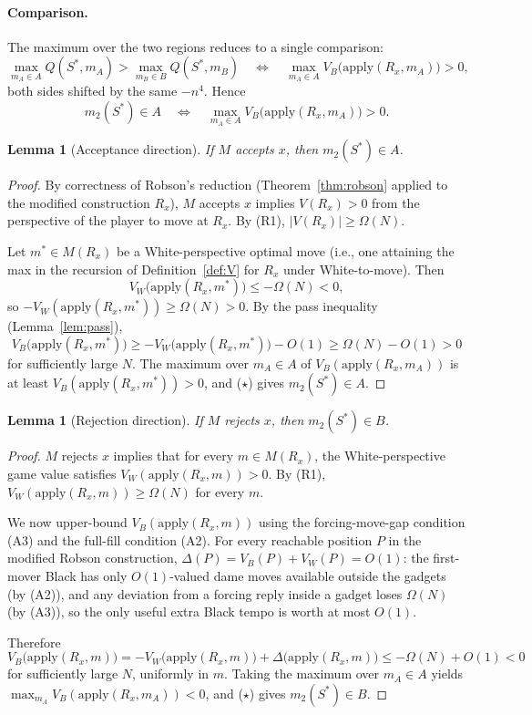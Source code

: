 \documentclass[11pt,a4paper]{amsart}
\theoremstyle{plain}
\newtheorem{lemma}[theorem]{Lemma}
\theoremstyle{definition}
\theoremstyle{remark}
\newcommand{\Apply}{\mathrm{apply}}
\begin{document}
\paragraph{Comparison.}
The maximum over the two regions reduces to a single comparison:
\[
  \max_{m_A \in A} Q(S^*, m_A) > \max_{m_B \in B} Q(S^*, m_B)
  \quad \Longleftrightarrow \quad
  \max_{m_A \in A} V_B\bigl(\Apply(R_x, m_A)\bigr) > 0,
\]
both sides shifted by the same $-n^4$. Hence
\[
  m_2(S^*) \in A
  \quad \Longleftrightarrow \quad
  \max_{m_A \in A} V_B\bigl(\Apply(R_x, m_A)\bigr) > 0.
  \tag{$\star$}
\]

\begin{lemma}[Acceptance direction]
\label{lem:accept}
If $M$ accepts $x$, then $m_2(S^*) \in A$.
\end{lemma}

\begin{proof}
By correctness of Robson's reduction (Theorem~\ref{thm:robson} applied
to the modified construction $R_x$), $M$ accepts $x$ implies
$V(R_x) > 0$ from the perspective of the player to move at $R_x$.
By (R1), $|V(R_x)| \geq \Omega(N)$.

Let $m^* \in M(R_x)$ be a White-perspective optimal move (i.e., one
attaining the max in the recursion of Definition~\ref{def:V} for $R_x$
under White-to-move). Then
\[
  V_W\bigl(\Apply(R_x, m^*)\bigr) \leq -\Omega(N) < 0,
\]
so $-V_W(\Apply(R_x, m^*)) \geq \Omega(N) > 0$. By the pass inequality
(Lemma~\ref{lem:pass}),
\[
  V_B\bigl(\Apply(R_x, m^*)\bigr)
  \geq -V_W\bigl(\Apply(R_x, m^*)\bigr) - O(1)
  \geq \Omega(N) - O(1) > 0
\]
for sufficiently large $N$. The maximum over $m_A \in A$ of
$V_B(\Apply(R_x, m_A))$ is at least $V_B(\Apply(R_x, m^*)) > 0$,
and ($\star$) gives $m_2(S^*) \in A$.
\end{proof}

\begin{lemma}[Rejection direction]
\label{lem:reject}
If $M$ rejects $x$, then $m_2(S^*) \in B$.
\end{lemma}

\begin{proof}
$M$ rejects $x$ implies that for every $m \in M(R_x)$, the
White-perspective game value satisfies
$V_W(\Apply(R_x, m)) > 0$. By (R1), $V_W(\Apply(R_x, m)) \geq \Omega(N)$
for every $m$.

We now upper-bound $V_B(\Apply(R_x, m))$ using the forcing-move-gap
condition (A3) and the full-fill condition (A2). For every reachable
position $P$ in the modified Robson construction,
$\Delta(P) = V_B(P) + V_W(P) = O(1)$:
the first-mover Black has only $O(1)$-valued dame moves available
outside the gadgets (by (A2)), and any deviation from a forcing reply
inside a gadget loses $\Omega(N)$ (by (A3)), so the only useful
extra Black tempo is worth at most $O(1)$.

Therefore
\[
  V_B\bigl(\Apply(R_x, m)\bigr)
  = -V_W\bigl(\Apply(R_x, m)\bigr) + \Delta\bigl(\Apply(R_x, m)\bigr)
  \leq -\Omega(N) + O(1) < 0
\]
for sufficiently large $N$, uniformly in $m$. Taking the maximum over
$m_A \in A$ yields $\max_{m_A} V_B(\Apply(R_x, m_A)) < 0$, and
($\star$) gives $m_2(S^*) \in B$.
\end{proof}
\end{document}
